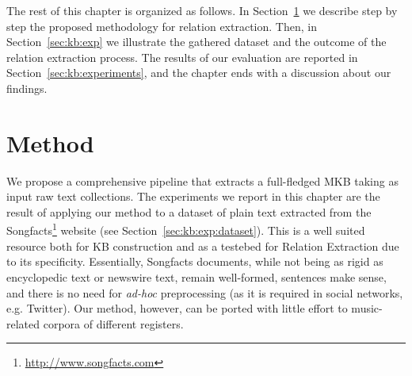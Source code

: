 

The rest of this chapter is organized as follows. In Section~\ref{sec:kb:method} we describe step by step the proposed methodology for relation extraction. Then, in Section~\ref{sec:kb:exp} we illustrate the gathered dataset and the outcome of the relation extraction process. The results of our evaluation are reported in Section~\ref{sec:kb:experiments}, and the chapter ends with a discussion about our findings.

\section{Method}
\label{sec:kb:method}

We propose a comprehensive pipeline that extracts a full-fledged MKB taking as input raw text collections. The experiments we report in this chapter are the result of applying our method to a dataset of plain text extracted from the Songfacts\footnote{\url{http://www.songfacts.com}} website (see Section~\ref{sec:kb:exp:dataset}). This is a well suited resource both for KB construction and as a testebed for Relation Extraction due to its specificity. Essentially, Songfacts documents, while not being as rigid as encyclopedic text or newswire text, remain well-formed, sentences make sense, and there is no need for \textit{ad-hoc} preprocessing (as it is required in social networks, e.g. Twitter). Our method, however, can be ported with little effort to music-related corpora of different registers.

